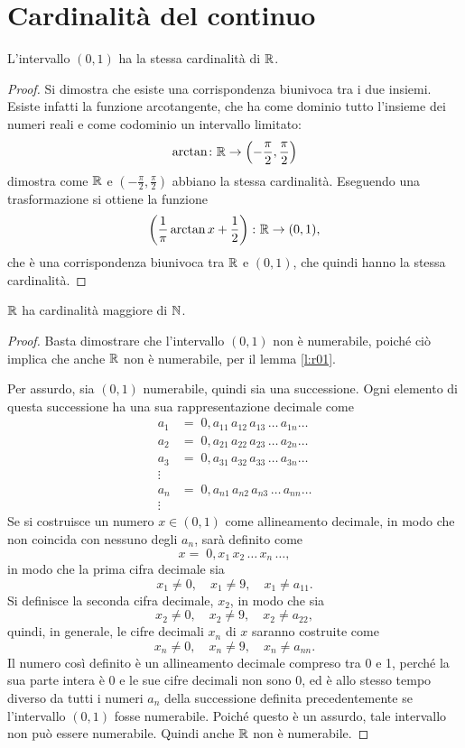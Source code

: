 \section{Cardinalità del continuo}
\begin{lemma}
\label{l:r01}
L'intervallo $(0,1)$ ha la stessa cardinalità di $\mathbb{R}$.
\end{lemma}
\begin{proof}
Si dimostra che esiste una corrispondenza biunivoca tra i due insiemi. Esiste infatti la funzione arcotangente, che ha come dominio tutto l'insieme dei numeri reali e come codominio un intervallo limitato:
\[
\arctan\colon\mathbb{R}\to\left(-\frac{\pi}2,\frac{\pi}2\right)
\]
dimostra come $\mathbb{R}$ e $\left(-\frac{\pi}2,\frac{\pi}2\right)$ abbiano la stessa cardinalità. Eseguendo una trasformazione si ottiene la funzione
\[
\left(\frac1{\pi}\arctan x+\frac12\right)\colon\mathbb{R}\to(0,1),
\]
che è una corrispondenza biunivoca tra $\mathbb{R}$ e $(0,1)$, che quindi hanno la stessa cardinalità.
\end{proof}
\begin{teorema}
$\mathbb{R}$ ha cardinalità maggiore di $\mathbb{N}$.
\end{teorema}
\begin{proof}
Basta dimostrare che l'intervallo $(0,1)$ non è numerabile, poiché ciò implica che anche $\mathbb{R}$ non è numerabile, per il lemma \ref{l:r01}.

Per assurdo, sia $(0,1)$ numerabile, quindi sia una successione. Ogni elemento di questa successione ha una sua rappresentazione decimale come
\begin{equation}
\begin{split}
a_1&=\;0,a_{11}\,a_{12}\,a_{13}\,\dots\,a_{1n}\dots\\
a_2&=\;0,a_{21}\,a_{22}\,a_{23}\,\dots\,a_{2n}\dots\\
a_3&=\;0,a_{31}\,a_{32}\,a_{33}\,\dots\,a_{3n}\dots\\
\vdots\\
a_n&=\;0,a_{n1}\,a_{n2}\,a_{n3}\,\dots\,a_{nn}\dots\\
\vdots
\end{split}
\end{equation}
Se si costruisce un numero $x\in(0,1)$ come allineamento decimale, in modo che non coincida con nessuno degli $a_n$, sarà definito come
\[
x=\;0,x_1\, x_2\,\dots\, x_n\,\dots,
\]
in modo che la prima cifra decimale sia
\[
x_1\neq 0,\quad x_1\neq 9,\quad x_1\neq a_{11}.
\]
Si definisce la seconda cifra decimale, $x_2$, in modo che sia
\[
x_2\neq 0,\quad x_2\neq 9,\quad x_2\neq a_{22},
\]
quindi, in generale, le cifre decimali $x_n$ di $x$ saranno costruite come
\[
x_n\neq 0,\quad x_n\neq 9,\quad x_n\neq a_{nn}.
\]
Il numero così definito è un allineamento decimale compreso tra 0 e 1, perché la sua parte intera è 0 e le sue cifre decimali non sono 0, ed è allo stesso tempo diverso da tutti i numeri $a_n$ della successione definita precedentemente se l'intervallo $(0,1)$ fosse numerabile. Poiché questo è un assurdo, tale intervallo non può essere numerabile.
Quindi anche $\mathbb{R}$ non è numerabile.
\end{proof}
